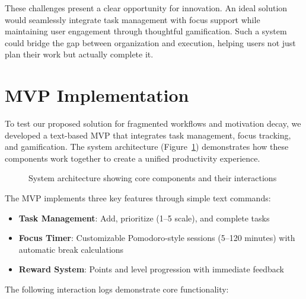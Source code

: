 \documentclass{article} %
\begin{document}
These challenges present a clear opportunity for innovation. An ideal solution would seamlessly integrate task management with focus support while maintaining user engagement through thoughtful gamification. Such a system could bridge the gap between organization and execution, helping users not just plan their work but actually complete it.

\section{MVP Implementation}
\label{sec:mvp_implementation}

To test our proposed solution for fragmented workflows and motivation decay, we developed a text-based MVP that integrates task management, focus tracking, and gamification. The system architecture (Figure~\ref{fig:architecture}) demonstrates how these components work together to create a unified productivity experience.

\begin{figure}[h]
\centering
{}
\caption{System architecture showing core components and their interactions}
\label{fig:architecture}
\end{figure}

The MVP implements three key features through simple text commands:

\begin{itemize}
    \item \textbf{Task Management}: Add, prioritize (1--5 scale), and complete tasks
    \item \textbf{Focus Timer}: Customizable Pomodoro-style sessions (5--120 minutes) with automatic break calculations
    \item \textbf{Reward System}: Points and level progression with immediate feedback
\end{itemize}

The following interaction logs demonstrate core functionality:
\end{document}
